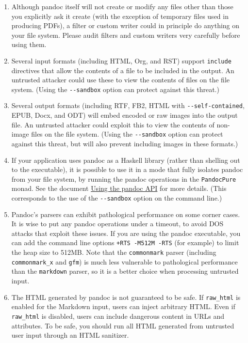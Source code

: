 \begin{enumerate}
\def\labelenumi{\arabic{enumi}.}
\item
  Although pandoc itself will not create or modify any files other than
  those you explicitly ask it create (with the exception of temporary
  files used in producing PDFs), a filter or custom writer could in
  principle do anything on your file system. Please audit filters and
  custom writers very carefully before using them.
\item
  Several input formats (including HTML, Org, and RST) support
  \texttt{include} directives that allow the contents of a file to be
  included in the output. An untrusted attacker could use these to view
  the contents of files on the file system. (Using the
  \texttt{-\/-sandbox} option can protect against this threat.)
\item
  Several output formats (including RTF, FB2, HTML with
  \texttt{-\/-self-contained}, EPUB, Docx, and ODT) will embed encoded
  or raw images into the output file. An untrusted attacker could
  exploit this to view the contents of non-image files on the file
  system. (Using the \texttt{-\/-sandbox} option can protect against
  this threat, but will also prevent including images in these formats.)
\item
  If your application uses pandoc as a Haskell library (rather than
  shelling out to the executable), it is possible to use it in a mode
  that fully isolates pandoc from your file system, by running the
  pandoc operations in the \texttt{PandocPure} monad. See the document
  \href{https://pandoc.org/using-the-pandoc-api.html}{Using the pandoc
  API} for more details. (This corresponds to the use of the
  \texttt{-\/-sandbox} option on the command line.)
\item
  Pandoc's parsers can exhibit pathological performance on some corner
  cases. It is wise to put any pandoc operations under a timeout, to
  avoid DOS attacks that exploit these issues. If you are using the
  pandoc executable, you can add the command line options
  \texttt{+RTS\ -M512M\ -RTS} (for example) to limit the heap size to
  512MB. Note that the \texttt{commonmark} parser (including
  \texttt{commonmark\_x} and \texttt{gfm}) is much less vulnerable to
  pathological performance than the \texttt{markdown} parser, so it is a
  better choice when processing untrusted input.
\item
  The HTML generated by pandoc is not guaranteed to be safe. If
  \texttt{raw\_html} is enabled for the Markdown input, users can inject
  arbitrary HTML. Even if \texttt{raw\_html} is disabled, users can
  include dangerous content in URLs and attributes. To be safe, you
  should run all HTML generated from untrusted user input through an
  HTML sanitizer.
\end{enumerate}


